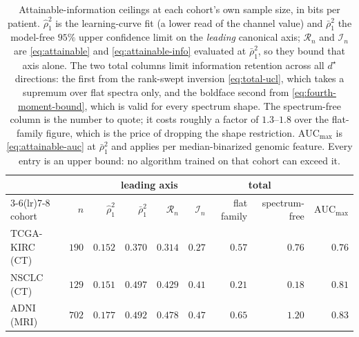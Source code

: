 \documentclass{article}
\begin{document}
\begin{table}[h]
\centering
\begin{tabular}{lrrrrrrrr}
\toprule
& & \multicolumn{4}{c}{leading axis} & \multicolumn{2}{c}{total} &\\
\cmidrule(lr){3-6}\cmidrule(lr){7-8}
cohort & $n$ & $\hat\rho_1^2$ & $\bar\rho_1^2$ &
$\mathcal{R}_n$ & $\mathcal{I}_n$ & flat family & spectrum-free & $\mathrm{AUC}_{\max}$\\
\midrule
TCGA-KIRC (CT) & $190$ & $0.152$ & $0.370$ & $0.314$ & $0.27$ & $0.57$ & $\mathbf{0.76}$ & $0.76$\\
NSCLC (CT)     & $129$ & $0.151$ & $0.497$ & $0.429$ & $0.41$ & $0.21$ & $\mathbf{0.18}$ & $0.81$\\
ADNI (MRI)     & $702$ & $0.177$ & $0.492$ & $0.478$ & $0.47$ & $0.65$ & $\mathbf{1.20}$ & $0.83$\\
\bottomrule
\end{tabular}
\caption{Attainable-information ceilings at each cohort's own sample size, in
bits per patient. $\hat\rho_1^2$ is the learning-curve fit (a lower read of the
channel value) and $\bar\rho_1^2$ the model-free $95\%$ upper confidence limit
on the \emph{leading} canonical axis; $\mathcal{R}_n$ and $\mathcal{I}_n$ are
\eqref{eq:attainable} and \eqref{eq:attainable-info} evaluated at
$\bar\rho_1^2$, so they bound that axis alone. The two total columns limit information retention across all $d^\star$
directions: the first from the rank-swept inversion \eqref{eq:total-ucl}, which
takes a supremum over flat spectra only, and the boldface second from
\eqref{eq:fourth-moment-bound}, which is valid for every spectrum shape. The
spectrum-free column is the number to quote; it costs roughly a factor of
$1.3$--$1.8$ over the flat-family figure, which is the price of dropping the
shape restriction. $\mathrm{AUC}_{\max}$ is
\eqref{eq:attainable-auc} at $\bar\rho_1^2$ and applies per median-binarized genomic feature. Every entry
is an upper bound: no algorithm trained on that cohort can exceed it.}
\label{tab:attainable}
\end{table}
\end{document}
